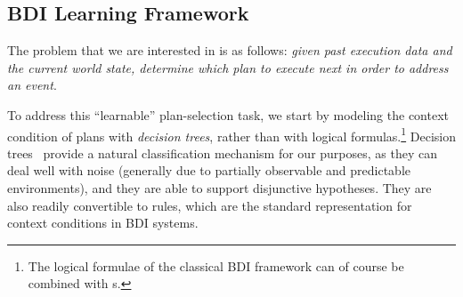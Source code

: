 % 
% 




\subsection{BDI Learning Framework}\label{sec:BDI_learning}


The problem that we are interested in is as follows: \emph{given past execution
data and the current world state, determine which plan to execute next 
in order to address an event}.


To address this ``learnable'' plan-selection task, we start by modeling the
context condition of plans with \emph{decision trees}, rather than with logical
formulas.\footnote{The logical formulae of the classical BDI framework can of course be combined with \dt s.}
Decision trees~\cite{Mitchell97:ML}  provide a natural classification mechanism
for our purposes, as they can deal well with noise (generally due to partially
observable and predictable environments), and they are able to support
disjunctive hypotheses. They are also readily convertible to rules, which are the
standard representation for context conditions in BDI systems.


